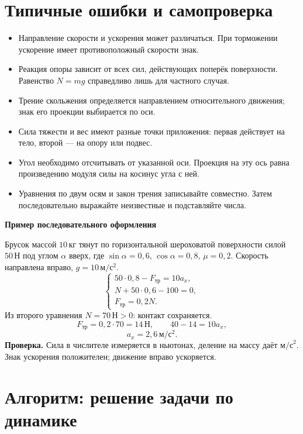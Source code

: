 \documentclass[a4paper,12pt]{article}
\newcommand{\fr}{F_{\text{тр}}}
\newcommand{\fa}{F_{\text{А}}}
\newcommand{\unit}[1]{\,\text{#1}}
\newcommand{\acc}{\unit{м/с$^2$}}
\newcommand{\N}{\unit{Н}}
\newcommand{\kg}{\unit{кг}}
\newcommand{\example}[1]{\par\medskip\textbf{\textcolor{darkaccent}{#1}}\par}
\begin{document}
\section{Типичные ошибки и самопроверка}
\begin{itemize}
\item Направление скорости и ускорения может различаться. При торможении ускорение имеет противоположный скорости знак.
\item Реакция опоры зависит от всех сил, действующих поперёк поверхности. Равенство $N=mg$ справедливо лишь для частного случая.
\item Трение скольжения определяется направлением относительного движения; знак его проекции выбирается по оси.
\item Сила тяжести и вес имеют разные точки приложения: первая действует на тело, второй --- на опору или подвес.
\item Угол необходимо отсчитывать от указанной оси. Проекция на эту ось равна произведению модуля силы на косинус угла с ней.
\item Уравнения по двум осям и закон трения записывайте совместно. Затем последовательно выражайте неизвестные и подставляйте числа.
\end{itemize}
\example{Пример последовательного оформления}
Брусок массой $10\kg$ тянут по горизонтальной шероховатой поверхности силой $50\N$ под углом $\alpha$ вверх, где $\sin\alpha=0,6$, $\cos\alpha=0,8$, $\mu=0,2$. Скорость направлена вправо, $g=10\acc$.
\[\begin{cases}50\cdot0,8-\fr=10a_x,\\N+50\cdot0,6-100=0,\\\fr=0,2N.\end{cases}\]
Из второго уравнения $N=70\N>0$: контакт сохраняется.
\[\fr=0,2\cdot70=14\N,\qquad 40-14=10a_x,\]
\[a_x=2,6\acc.\]
\textbf{Проверка.} Сила в числителе измеряется в ньютонах, деление на массу даёт $\text{м/с}^2$. Знак ускорения положителен; движение вправо ускоряется.
\clearpage
\section*{Алгоритм: решение задачи по динамике}
\begin{center}
\end{center}
\clearpage
\end{document}
